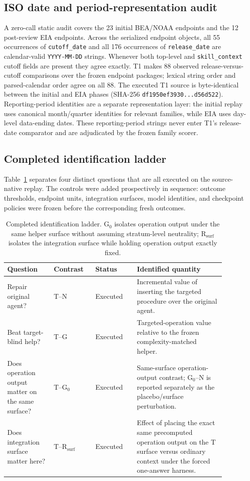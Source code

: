 \subsection{ISO date and period-representation audit}
A zero-call static audit covers the 23 initial BEA/NOAA endpoints and the 12 post-review EIA endpoints. Across the serialized endpoint objects, all 55 occurrences of \texttt{cutoff\_date} and all 176 occurrences of \texttt{release\_date} are calendar-valid \texttt{YYYY-MM-DD} strings. Whenever both top-level and \texttt{skill\_context} cutoff fields are present they agree exactly. T1 makes 88 observed release-versus-cutoff comparisons over the frozen endpoint packages; lexical string order and parsed-calendar order agree on all 88. The executed T1 source is byte-identical between the initial and EIA phases (SHA-256 \texttt{df1950ef3930...d56d522}). Reporting-period identities are a separate representation layer: the initial replay uses canonical month/quarter identities for relevant families, while EIA uses day-level data-ending dates. These reporting-period strings never enter T1's release-date comparator and are adjudicated by the frozen family scorer.

\subsection{Completed identification ladder}
Table~\ref{tab:identification} separates four distinct questions that are all executed on the source-native replay. The controls were added prospectively in sequence: outcome thresholds, endpoint units, integration surfaces, model identities, and checkpoint policies were frozen before the corresponding fresh outcomes.

\begin{table}[ht]
\centering
\scriptsize
\setlength{\tabcolsep}{3.0pt}
\begin{tabular}{p{0.19\linewidth}p{0.17\linewidth}p{0.17\linewidth}p{0.36\linewidth}}
\toprule
Question & Contrast & Status & Identified quantity \\
\midrule
Repair original agent? & T--N & Executed & Incremental value of inserting the targeted procedure over the original agent. \\
Beat target-blind help? & T--G & Executed & Targeted-operation value relative to the frozen complexity-matched helper. \\
Does operation output matter on the same surface? & T--G$_0$ & Executed & Same-surface operation-output contrast; G$_0$--N is reported separately as the placebo/surface perturbation. \\
Does integration surface matter here? & T--R$_{\mathrm{surf}}$ & Executed & Effect of placing the exact same precomputed operation output on the T surface versus ordinary context under the forced one-answer harness. \\
\bottomrule
\end{tabular}
\caption{Completed identification ladder. G$_0$ isolates operation output under the same helper surface without assuming stratum-level neutrality; R$_{\mathrm{surf}}$ isolates the integration surface while holding operation output exactly fixed.}
\label{tab:identification}
\end{table}

